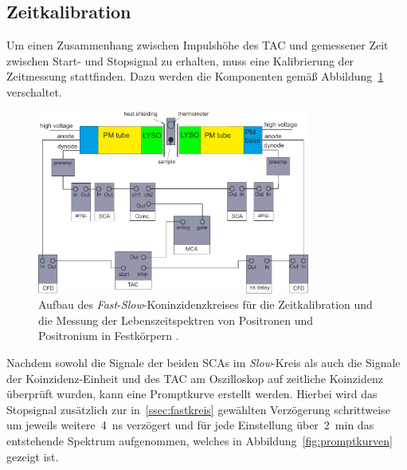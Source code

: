 \documentclass[11pt, a4paper]{article}
\numberwithin{equation}{section}
\begin{document}
\subsection{Zeitkalibration}
\label{sec:zeitkalibration}
Um einen Zusammenhang zwischen Impulshöhe des TAC und gemessener Zeit zwischen Start- und Stopsignal zu erhalten, muss eine Kalibrierung der Zeitmessung stattfinden.
Dazu werden die Komponenten gemäß Abbildung~\ref{fig:fast_slow_coincidence} verschaltet.
\begin{figure}[h]
	\centering
	\includegraphics[width=0.8\textwidth]{./figures/aufbau/zeit.pdf}
	\caption{Aufbau des \textit{Fast}-\textit{Slow}-Koninzidenzkreises für die Zeitkalibration und die Messung der Lebenszeitspektren von Positronen und Positronium in Festkörpern \cite{anleitung}.}
	\label{fig:fast_slow_coincidence}
\end{figure}
Nachdem sowohl die Signale der beiden SCAs im \textit{Slow}-Kreis als auch die Signale der Koinzidenz-Einheit und des TAC am Oszilloskop auf zeitliche Koinzidenz überprüft wurden, kann eine Promptkurve erstellt werden.
Hierbei wird das Stopsignal zusätzlich zur in~\ref{ssec:fastkreis} gewählten Verzögerung schrittweise um jeweils weitere~\SI{4}{ns} verzögert und für jede Einstellung über~\SI{2}{min} das entstehende Spektrum aufgenommen, welches in Abbildung~\ref{fig:promptkurven} gezeigt ist.
\end{document}
